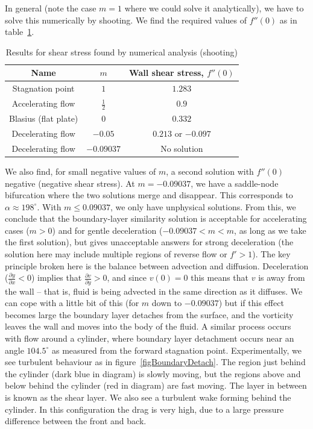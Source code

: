 \documentclass[../Main.tex]{subfiles}
\begin{document}
In general (note the case $m = 1$ where we could solve it analytically), %
we have to solve this numerically by shooting. We find the required values of $f''(0)$ as in table~\ref{tabShootingResults}.
\begin{table}
   \begin{tabular}{|c|c|c|}
        \hline
        Name & $m$ & Wall shear stress, $f''(0)$ \\
        \hline
        Stagnation point & $1$ & $1.283$ \\
        Accelerating flow & $\frac12$ & $0.9$ \\
        Blasius (flat plate) & $0$ & $0.332$ \\
        Decelerating flow & $-0.05$ & $0.213$ or $-0.097$ \\
        Decelerating flow & $-0.09037$ & No solution \\
        \hline
   \end{tabular}
   \caption{Results for shear stress found by numerical analysis (shooting)}
   \label{tabShootingResults} 
\end{table}

We also find, for small negative values of $m$, a second solution with $f''(0)$ negative (negative shear stress). At $m = -0.09037$, we have a saddle-node bifurcation where the two solutions merge and disappear. This corresponds to $\alpha \approx 198^\circ$. With $m \leq 0.09037$, we only have unphysical solutions. From this, we conclude that the boundary-layer similarity solution is acceptable for accelerating cases ($m > 0$) and for gentle deceleration ($-0.09037 < m < m$, as long as we take the first solution), but gives unacceptable answers for strong deceleration (the solution here may include multiple regions of reverse flow or $f' > 1$).
The key principle broken here is the balance between advection and diffusion. Deceleration ($\frac{\partial y}{\partial x} < 0$) implies that $\frac{\partial v}{\partial y} > 0$, and since $v(0) = 0$ this means that $v$ is away from the wall -- that is, fluid is being advected in the same direction as it diffuses. We can cope with a little bit of this (for $m$ down to $-0.09037$) but if this effect becomes large the boundary layer detaches from the surface, and the vorticity leaves the wall and moves into the body of the fluid. A similar process occurs with flow around a cylinder, where boundary layer detachment occurs near an angle $104.5^\circ$ as measured from the forward stagnation point. Experimentally, we see turbulent behaviour as in figure~\ref{figBoundaryDetach}. The region just behind the cylinder (dark blue in diagram) is slowly moving, but the regions above and below behind the cylinder (red in diagram) are fast moving. The layer in between is known as the shear layer. We also see a turbulent wake forming behind the cylinder. In this configuration the drag is very high, due to a large pressure difference between the front and back.
\end{document}
